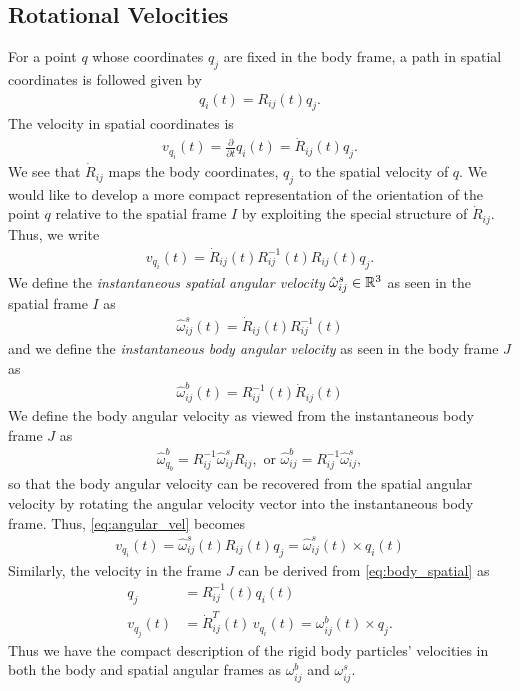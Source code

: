 \subsection{Rotational Velocities}
%
For a point $q$ whose coordinates $q_j$ are fixed in the body frame, a path in spatial coordinates is followed given by 
%
\begin{align}
	q_i(t) = R_{ij}(t) q_j.
	\label{eq:body_spatial}
\end{align}
%
The velocity in spatial coordinates is 
%
\begin{align}
	v_{q_i}(t) = \frac{\partial}{\partial t} q_i(t) = \dot{R}_{ij}(t) q_j.
\end{align}
%
We see that $\dot{R}_{ij}$ maps the body coordinates, $q_j$ to the spatial velocity of $q$. We would like to develop a more compact representation of the orientation of the point $q$ relative to the spatial frame $I$ by exploiting the special structure of $\dot{R}_{ij}$.  Thus, we write 
%
\begin{align}
	v_{q_i}(t) = \dot{R}_{ij}(t) R_{ij}^{-1}(t) R_{ij}(t) q_j.
	\label{eq:angular_vel}
\end{align}
%
We define the \textit{instantaneous spatial angular velocity} $\hat{\omega}^s_{ij} \in \mathbb{R}^3$ as seen in the spatial frame $I$ as 
%
\begin{align}
	\hat{\omega}^s_{ij}(t) =	\dot{R}_{ij}(t) R_{ij}^{-1}(t) %
\end{align}
%
and we define the \textit{instantaneous body angular velocity}  as seen in the body frame $J$ as
%
\begin{align}
\hat{\omega}^b_{ij}(t) = R_{ij}^{-1}(t) \dot{R}_{ij}(t) %
\end{align}
%
We define the body angular velocity  as viewed from the instantaneous body frame $J$ as 
%
\begin{align}
\hat{\omega}^b_{q_b} = R^{-1}_{ij} \hat{\omega}^s_{ij} R_{ij}, \text{ or }  \hat{\omega}^b_{ij} = R^{-1}_{ij} \hat{\omega}^s_{ij},
\end{align}
%
so that the body angular velocity can be recovered from the spatial angular velocity by rotating the angular velocity vector into the instantaneous body frame. Thus, \eqref{eq:angular_vel} becomes 
%
\begin{align}
v_{q_i}(t) = \hat{\omega}^s_{ij}(t) R_{ij}(t) q_j = \hat{\omega}^s_{ij}(t) \times q_i(t)
\label{eq:angular_vel_compact}
\end{align}
%
Similarly, the velocity in the frame $J$ can be derived from \eqref{eq:body_spatial} as
%
\begin{subequations}
	\begin{align}
	q_j &= R_{ij}^{-1}(t) q_i(t) \\
	v_{q_j}(t) &= \dot{R}_{ij}^T(t) \, v_{q_i}(t) = \omega_{ij}^b(t) \times q_j.
	\end{align}
\end{subequations}
%
Thus we have the compact description of the rigid body particles' velocities in both the body and spatial angular frames as $\omega_{ij}^b$ and $\omega_{ij}^s$.

